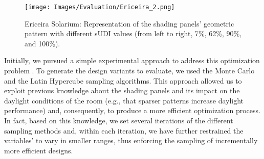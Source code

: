 
\begin{figure}[htpb]
	\centering
	\texttt{[image: Images/Evaluation/Ericeira\_2.png]}
	\caption[Ericeira Solarium: Different representations of the shading panels’ geometric pattern]{Ericeira Solarium: Representation of the shading panels’ geometric pattern with different sUDI values (from left to right, 7\%, 62\%, 90\%, and 100\%).}
	\label{fig:ericeira_multiple_panels}
\end{figure}

Initially, we pursued a simple experimental approach to address this optimization problem \cite{Caetano2018}. To generate the design variants to evaluate, we used the Monte Carlo and the Latin Hypercube sampling algorithms. This approach allowed us to exploit previous knowledge about the shading panels and its impact on the daylight conditions of the room (e.g., that sparser patterns increase daylight performance) and, consequently, to produce a more efficient optimization process. In fact, based on this knowledge, we set several iterations of the different sampling methods and, within each iteration, we have further restrained the variables' to vary in smaller ranges, thus enforcing the sampling of incrementally more efficient designs. %


